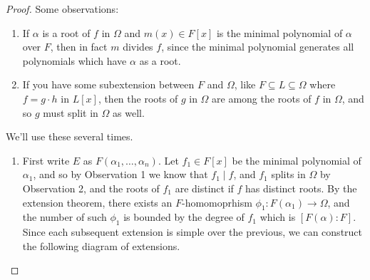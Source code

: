 \begin{proof}
Some observations:
\begin{enumerate}
\item If $\alpha$ is a root of $f$ in $\Omega$ and $m(x) \in F[x]$ is the minimal polynomial of $\alpha$ over $F$, then in fact $m$ divides $f$, since the minimal polynomial generates all polynomials which have $\alpha$ as a root.
\item If you have some subextension between $F$ and $\Omega$, like $F \subseteq L \subseteq \Omega$ where $f = g \cdot h$ in $L[x]$, then the roots of $g$ in $\Omega$ are among the roots of $f$ in $\Omega$, and so $g$ must split in $\Omega$ as well.
\end{enumerate}
We'll use these several times. 
\begin{enumerate}[label={\textup{(\alph*)}}]
\item  First write $E$ as $F(\alpha_1, \dotsc, \alpha_n)$. Let $f_1 \in F[x]$ be the minimal polynomial of $\alpha_1$, and so by Observation 1 we know that $f_1 \mid f$, and $f_1$ splits in $\Omega$ by Observation 2, and the roots of $f_1$ are distinct if $f$ has distinct roots. By the extension theorem, there exists an $F$-homomoprhism $\phi_1\colon F(\alpha_1) \to \Omega$, and the number of such $\phi_1$ is bounded by the degree of $f_1$ which is $[F(\alpha) : F]$. Since each subsequent extension is simple over the previous, we can construct the following diagram of extensions.
\begin{center}
\end{center}
\end{enumerate}
\end{proof}